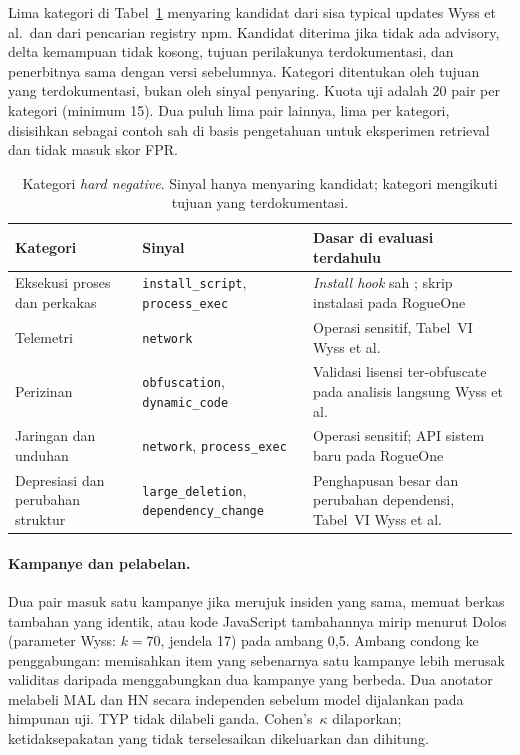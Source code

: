 \documentclass[a4paper,fleqn]{cas-dc}
\begin{document}
Lima kategori di Tabel~\ref{tab:hn} menyaring kandidat dari sisa typical
updates Wyss et al.\ dan dari pencarian registry npm. Kandidat diterima jika
tidak ada advisory, delta kemampuan tidak kosong, tujuan perilakunya
terdokumentasi, dan penerbitnya sama dengan versi sebelumnya. Kategori
ditentukan oleh tujuan yang terdokumentasi, bukan oleh sinyal penyaring.
Kuota uji adalah 20 pair per kategori (minimum 15). Dua puluh lima pair
lainnya, lima per kategori, disisihkan sebagai contoh sah di basis pengetahuan
untuk eksperimen retrieval dan tidak masuk skor FPR.

\begin{table}[t]
\caption{Kategori \emph{hard negative}. Sinyal hanya menyaring kandidat;
kategori mengikuti tujuan yang terdokumentasi.}
\label{tab:hn}
\small
\begin{tabular}{p{2.2cm} p{2.0cm} p{3.4cm}}
\hline
Kategori & Sinyal & Dasar di evaluasi terdahulu \\
\hline
Eksekusi proses dan perkakas
  & \texttt{install\_script}, \texttt{process\_exec}
  & \emph{Install hook} sah \citep{guo2026effective}; skrip instalasi pada RogueOne \\
Telemetri
  & \texttt{network}
  & Operasi sensitif, Tabel~VI Wyss et al. \\
Perizinan
  & \texttt{obfuscation}, \texttt{dynamic\_code}
  & Validasi lisensi ter-obfuscate pada analisis langsung Wyss et al. \\
Jaringan dan unduhan
  & \texttt{network}, \texttt{process\_exec}
  & Operasi sensitif; API sistem baru pada RogueOne \\
Depresiasi dan perubahan struktur
  & \texttt{large\_deletion}, \texttt{dependency\_change}
  & Penghapusan besar dan perubahan dependensi, Tabel~VI Wyss et al. \\
\hline
\end{tabular}
\end{table}

\paragraph{Kampanye dan pelabelan.}
Dua pair masuk satu kampanye jika merujuk insiden yang sama, memuat berkas
tambahan yang identik, atau kode JavaScript tambahannya mirip menurut Dolos
(parameter Wyss: $k{=}70$, jendela 17) pada ambang 0,5. Ambang condong ke
penggabungan: memisahkan item yang sebenarnya satu kampanye lebih merusak
validitas daripada menggabungkan dua kampanye yang berbeda. Dua anotator
melabeli MAL dan HN secara independen sebelum model dijalankan pada himpunan
uji. TYP tidak dilabeli ganda. Cohen's~$\kappa$ dilaporkan; ketidaksepakatan
yang tidak terselesaikan dikeluarkan dan dihitung.
\end{document}
